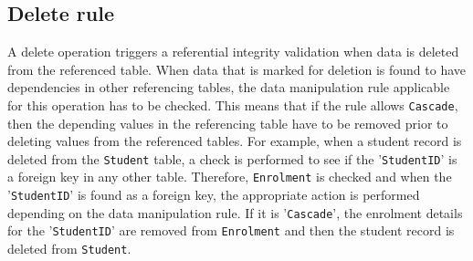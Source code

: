 \subsection{Delete rule} A delete operation triggers a referential integrity
		validation when data is deleted from the referenced table.  When data that is
		marked for deletion is found to have dependencies in other referencing tables,  
		the data manipulation rule applicable for this operation has to be checked. 
		This means that if the rule allows \texttt{Cascade},   then the depending values
		in the referencing table have to be removed prior to deleting values from the
		referenced tables.  For example,   when a student record is deleted from the
		\texttt{Student} table,   a check is performed to see if the
		'\texttt{StudentID}' is a foreign key in any other table.  Therefore,  
		\texttt{Enrolment} is checked and when the '\texttt{StudentID}' is found
		as a foreign key,   the appropriate action is performed depending on the data
		manipulation rule.  If it is '\texttt{Cascade}',   the enrolment details for the
		'\texttt{StudentID}' are removed from \texttt{Enrolment} and then the student
		record is deleted from
		\texttt{Student}. 
	


 


